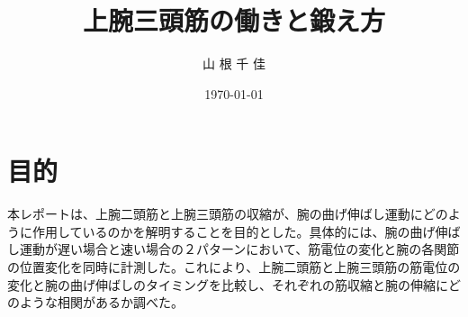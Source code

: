 \documentclass{jsarticle}
\title{上腕三頭筋の働きと鍛え方}
\date{\today}
\author{山 根 千 佳}
\begin{document}
%

\maketitle


\section{目的}
本レポートは、上腕二頭筋と上腕三頭筋の収縮が、腕の曲げ伸ばし運動にどのように作用しているのかを解明することを目的とした。具体的には、腕の曲げ伸ばし運動が遅い場合と速い場合の２パターンにおいて、筋電位の変化と腕の各関節の位置変化を同時に計測した。これにより、上腕二頭筋と上腕三頭筋の筋電位の変化と腕の曲げ伸ばしのタイミングを比較し、それぞれの筋収縮と腕の伸縮にどのような相関があるか調べた。
\end{document}
